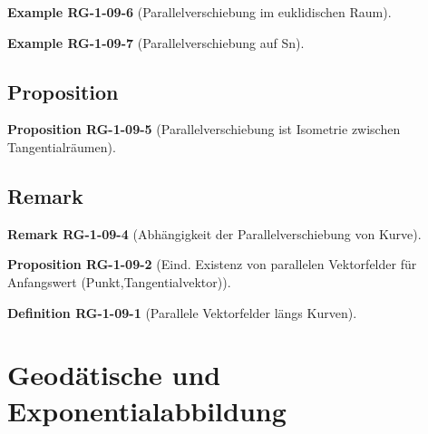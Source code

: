 \documentclass[10pt, letterpaper]{article}
\newcommand{\CustomHeading}[3]{%
  \par\medskip\noindent%
  \textbf{#1 #2} \textnormal{(#3)}.\enskip%
}
\newenvironment{DEF}[2]{\CustomHeading{Definition}{#1}{#2}}{}
\newenvironment{PROP}[2]{\CustomHeading{Proposition}{#1}{#2}}{}
\newenvironment{REM}[2]{\CustomHeading{Remark}{#1}{#2}}{}
\newenvironment{EXA}[2]{\CustomHeading{Example}{#1}{#2}}{}
\begin{document}
\begin{EXA}{RG-1-09-6}{Parallelverschiebung im euklidischen Raum}

\end{EXA}

\begin{EXA}{RG-1-09-7}{Parallelverschiebung auf Sn}

\end{EXA}



\subsection{Proposition}

\begin{PROP}{RG-1-09-5}{Parallelverschiebung ist Isometrie zwischen Tangentialräumen}

\end{PROP}



\subsection{Remark}



\begin{REM}{RG-1-09-4}{Abhängigkeit der Parallelverschiebung von Kurve}

\end{REM}





\begin{PROP}{RG-1-09-2}{Eind. Existenz von parallelen Vektorfelder für Anfangswert (Punkt,Tangentialvektor)}

\end{PROP}





\begin{DEF}{RG-1-09-1}{Parallele Vektorfelder längs Kurven}

\end{DEF}








\section{Geodätische und Exponentialabbildung}
\end{document}

